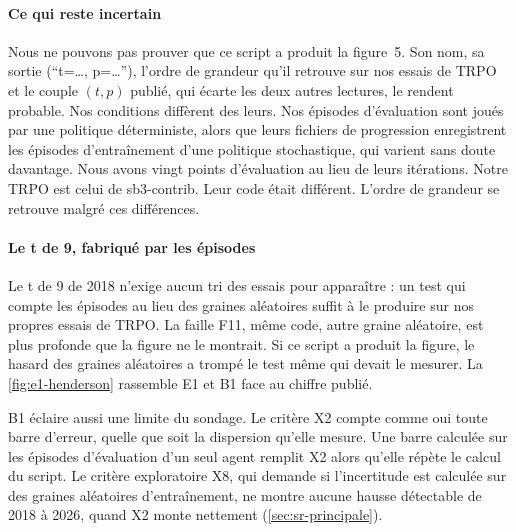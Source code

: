 \paragraph{Ce qui reste incertain}
Nous ne pouvons pas prouver que ce script a produit la figure~5. Son nom, sa sortie (\enquote{t=\dots, p=\dots}),
l'ordre de grandeur qu'il retrouve sur nos essais de TRPO et le couple $(t,p)$ publié, qui écarte les deux
autres lectures, le rendent probable. Nos conditions diffèrent des leurs. Nos épisodes d'évaluation sont joués par une politique déterministe, alors que
leurs fichiers de progression enregistrent les épisodes d'entraînement d'une politique stochastique, qui
varient sans doute davantage. Nous avons vingt points d'évaluation au lieu de leurs itérations. Notre TRPO est
celui de sb3-contrib. Leur code était différent. L'ordre de grandeur se retrouve malgré ces différences.

\paragraph{Le t de 9, fabriqué par les épisodes}
Le t de 9 de 2018 n'exige aucun tri des essais pour apparaître : un test qui compte les épisodes au lieu des
graines aléatoires suffit à le produire sur nos propres essais de TRPO. La faille F11, même code, autre graine
aléatoire, est plus profonde que la figure ne le montrait. Si ce script a produit la figure, le hasard des
graines aléatoires a trompé le test même qui devait le mesurer. La
\cref{fig:e1-henderson} rassemble E1 et B1 face au chiffre publié.

B1 éclaire aussi une limite du sondage. Le critère X2 compte comme oui toute barre d'erreur, quelle que soit
la dispersion qu'elle mesure. Une barre calculée sur les épisodes d'évaluation d'un seul agent remplit X2 alors
qu'elle répète le calcul du script. Le critère exploratoire X8, qui demande si l'incertitude est calculée sur
des graines aléatoires d'entraînement, ne montre aucune hausse détectable de 2018 à 2026, quand X2 monte
nettement (\cref{sec:sr-principale}).


